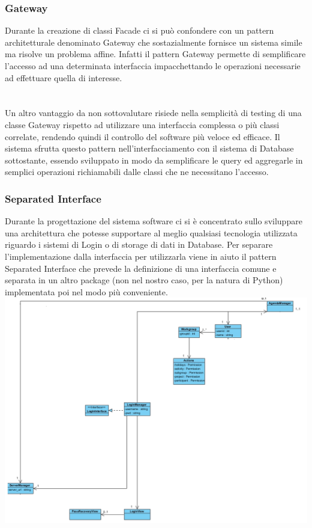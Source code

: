 \documentclass[12pt]{scrartcl}
\begin{document}
\subsubsection{Gateway}
Durante la creazione di classi Facade ci si pu\`o confondere con un pattern
architetturale denominato Gateway che sostazialmente fornisce un sistema
simile ma risolve un problema affine. Infatti il pattern Gateway permette
di semplificare l'accesso ad una determinata interfaccia impacchettando le operazioni
necessarie ad effettuare quella di interesse. \\\\\\
Un altro vantaggio da non sottovalutare risiede nella semplicit\`a di testing
di una classe Gateway rispetto ad utilizzare una interfaccia complessa o pi\`u
classi correlate, rendendo quindi il controllo del software pi\`u veloce ed efficace.
Il sistema sfrutta questo pattern nell'interfacciamento con il sistema di Database
sottostante, essendo sviluppato in modo da semplificare le query ed aggregarle in
semplici operazioni richiamabili dalle classi che ne necessitano l'accesso.

\subsubsection{Separated Interface}
Durante la progettazione del sistema software ci si \`e concentrato sullo sviluppare
una architettura che potesse supportare al meglio qualsiasi tecnologia utilizzata
riguardo i sistemi di Login o di storage di dati in Database.
Per separare l'implementazione dalla interfaccia per utilizzarla viene in aiuto
il pattern Separated Interface che prevede la definizione di una interfaccia
comune e separata in un altro package (non nel nostro caso, per la natura di Python)
implementata poi nel modo pi\`u conveniente.\\
    \includegraphics[scale=0.45]{4.png}
\end{document}
